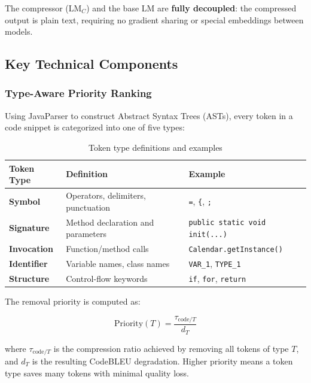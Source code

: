 \documentclass[11pt,a4paper]{article}
\begin{document}
The compressor ($\text{LM}_C$) and the base LM are \textbf{fully decoupled}: the compressed output is plain text, requiring no gradient sharing or special embeddings between models.

\subsection{Key Technical Components}

\subsubsection{Type-Aware Priority Ranking}

Using JavaParser to construct Abstract Syntax Trees (ASTs), every token in a code snippet is categorized into one of five types:

\begin{table}[H]
  \centering
  \caption{Token type definitions and examples}
  \label{tab:token-types}
  \renewcommand{\arraystretch}{1.15}
  \begin{tabularx}{\textwidth}{L{2.5cm} X L{4.5cm}}
    \toprule
    \textbf{Token Type} & \textbf{Definition} & \textbf{Example} \\
    \midrule
    \textbf{Symbol}     & Operators, delimiters, punctuation      & \texttt{=}, \texttt{\{}, \texttt{;} \\
    \textbf{Signature}  & Method declaration and parameters        & \texttt{public static void init(...)} \\
    \textbf{Invocation} & Function/method calls                    & \texttt{Calendar.getInstance()} \\
    \textbf{Identifier} & Variable names, class names              & \texttt{VAR\_1}, \texttt{TYPE\_1} \\
    \textbf{Structure}  & Control-flow keywords                    & \texttt{if}, \texttt{for}, \texttt{return} \\
    \bottomrule
  \end{tabularx}
\end{table}

The removal priority is computed as:

\begin{equation}
  \text{Priority}(T) = \frac{\tau_{\text{code}/T}}{d_T}
\end{equation}

where $\tau_{\text{code}/T}$ is the compression ratio achieved by removing all tokens of type $T$, and $d_T$ is the resulting CodeBLEU degradation. Higher priority means a token type saves many tokens with minimal quality loss.
\end{document}
